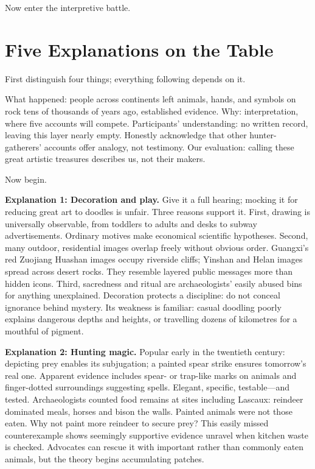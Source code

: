 Now enter the interpretive battle.

\section{Five Explanations on the Table}
First distinguish four things; everything following depends on it.

What happened: people across continents left animals, hands, and symbols on rock tens of thousands of years ago, established evidence. Why: interpretation, where five accounts will compete. Participants' understanding: no written record, leaving this layer nearly empty. Honestly acknowledge that other hunter-gatherers' accounts offer analogy, not testimony. Our evaluation: calling these great artistic treasures describes us, not their makers.

Now begin.

\textbf{Explanation 1: Decoration and play.} Give it a full hearing; mocking it for reducing great art to doodles is unfair. Three reasons support it. First, drawing is universally observable, from toddlers to adults and desks to subway advertisements. Ordinary motives make economical scientific hypotheses. Second, many outdoor, residential images overlap freely without obvious order. Guangxi's red Zuojiang Huashan images occupy riverside cliffs; Yinshan and Helan images spread across desert rocks. They resemble layered public messages more than hidden icons. Third, sacredness and ritual are archaeologists' easily abused bins for anything unexplained. Decoration protects a discipline: do not conceal ignorance behind mystery. Its weakness is familiar: casual doodling poorly explains dangerous depths and heights, or travelling dozens of kilometres for a mouthful of pigment.

\textbf{Explanation 2: Hunting magic.} Popular early in the twentieth century: depicting prey enables its subjugation; a painted spear strike ensures tomorrow's real one. Apparent evidence includes spear- or trap-like marks on animals and finger-dotted surroundings suggesting spells. Elegant, specific, testable---and tested. Archaeologists counted food remains at sites including Lascaux: reindeer dominated meals, horses and bison the walls. Painted animals were not those eaten. Why not paint more reindeer to secure prey? This easily missed counterexample shows seemingly supportive evidence unravel when kitchen waste is checked. Advocates can rescue it with important rather than commonly eaten animals, but the theory begins accumulating patches.

